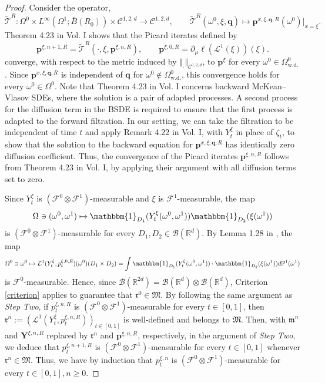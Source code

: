 \documentclass{article}
\newcommand{\R}{\mathbb{R}}
\begin{document}
\begin{appendices}
\begin{proof}
Consider the operator,
\[
\widetilde{\mathcal T}^R:\Omega^0\times L^\infty(\Omega^1;\bar B(R_0))\times \mathscr{C}^{1,2,d}\to \mathscr{C}^{1,2,d}, \qquad \widetilde{\mathcal T}^R(\omega^0,\xi,\bm{q})\mapsto \bm{p}^{x,\xi,\bm{q},R}(\omega^0)|_{x=\xi}.
\]
Theorem 4.23 in \cite{carmona2018probabilistic} Vol. I shows that the Picard iterates defined by
\[
\bm{p}^{\xi,n+1,R} = \widetilde{\mathcal T}^R(\cdot,\xi,\bm{p}^{\xi,n,R}) , \qquad \bm{p}^{\xi,0,R}=\partial_\mu\ell(\mathcal L^1(\xi))(\xi).
\]
converge, with respect to the metric induced by $\Vert_\cdot\Vert_{\mathscr{C}^{1,2,d}}$, to $\bm p^\xi$ for every $\omega^0\in \Omega^0_\mathrm{w.d.}$. Since $\bm{p}^{x,\xi,\bm{q},R}$ is independent of $\bm{q}$ for $\omega^0\notin \Omega^0_\mathrm{w.d.}$, this convergence holds for every $\omega^0\in\Omega^0$. Note that Theorem 4.23 in \cite{carmona2018probabilistic} Vol. I concerns backward McKean--Vlasov SDEs, where the solution is a pair of adapted processes. A second process for the diffusion term in the BSDE is required to ensure that the first process is adapted to the forward filtration. In our setting, we can take the filtration to be independent of time $t$ and apply Remark 4.22 in \cite{carmona2018probabilistic} Vol. I, with $Y^\xi_t$ in place of $\zeta_t$, to show that the solution to the backward equation for $\bm{p}^{x,\xi,\bm{q},R}$ has identically zero diffusion coefficient. Thus, the convergence of the Picard iterates $\bm p^{\xi,n,R}$ follows from Theorem 4.23 in \cite{carmona2018probabilistic} Vol. I, by applying their argument with all diffusion terms set to zero.

 Since $Y^\xi_t$ is $(\mathcal F^0\otimes \mathcal F^1)$-measurable and $\xi $ is $\mathcal F^1$-measurable, the map 
\[
\Omega\ni (\omega^0,\omega^1)\mapsto \mathbbm{1}_{D_1}(Y^{\xi}_t(\omega^0,\omega^1))\mathbbm{1}_{D_2}(\xi(\omega^1))
\]
is $(\mathcal F^0\otimes \mathcal F^1)$-measurable for every $D_1,D_2\in \mathcal B(\R^d)$. By Lemma 1.28 in \cite{Kallenberg2021}, the map \[\Omega^0\ni\omega^0\mapsto \mathcal L^1(Y^\xi_t,p^{\xi,0,R}_t)(\omega^0)(D_1\times D_2)= \int \mathbbm{1}_{D_1}(Y^{\xi}_t(\omega^0,\omega^1))\cdot\mathbbm{1}_{D_2}(\xi(\omega^1))d\mathbb P^1(\omega^1)\] is $\mathcal F^0$-measurable. Hence, since $\mathcal B(\R^{2d})=\mathcal B(\R^d)\otimes \mathcal B(\R^d)$, Criterion \ref{criterion} applies to guarantee that $\bm{\mathfrak{r}}^0\in \mathfrak{M}$.
By following the same argument as \textit{Step Two}, if $p^{\xi,n,R}_t$ is $(\mathcal F^0\otimes\mathcal F^1)$-measurable for every $t\in[0,1]$, then $\bm{\mathfrak{r}}^n:=(\mathcal L^1(Y^\xi_t,p^{\xi,n,R}_t))_{t\in[0,1]}$ is well-defined and belongs to $\mathfrak{M}$. Then, with $\bm{\mathfrak{m}}^n$ and $\bm Y^{\xi,n,R}$ replaced by $\bm{\mathfrak{r}}^n$ and $\bm{p}^{\xi,n,R}$, respectively, in the argument of \textit{Step Two}, we deduce that $p_t^{\xi,n+1,R}$ is $(\mathcal F^0\otimes\mathcal F^1)$-measurable for every $t\in[0,1]$ whenever $\bm{\mathfrak{r}}^n\in\mathfrak{M}$. Thus, we have by induction that $p^{\xi,n}_t$ is $(\mathcal F^0\otimes \mathcal F^1)$-measurable for every $t\in[0,1], n\ge 0$. 


\end{proof}
\end{appendices}
\end{document}
